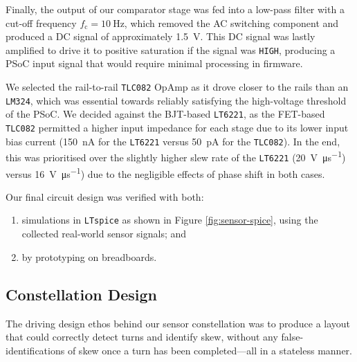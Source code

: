 \documentclass[conference]{IEEEtran}
\begin{document}
Finally, the output of our comparator stage was fed into a low-pass filter with a cut-off frequency $f_\text{c}=\qty{10}{\hertz}$, which removed the AC switching component and produced a DC signal of approximately \qty{1.5}{\volt}.
This DC signal was lastly amplified to drive it to positive saturation if the signal was \texttt{HIGH}, producing a PSoC input signal that would require minimal processing in firmware.

We selected the rail-to-rail \texttt{TLC082} OpAmp as it drove closer to the rails than an \texttt{LM324}, which was essential towards reliably satisfying the high-voltage threshold of the PSoC. We decided against the BJT-based \texttt{LT6221}, as the FET-based \texttt{TLC082} permitted a higher input impedance for each stage due to its lower input bias current (\qty{150}{\nA} for the \texttt{LT6221} versus \qty{50}{\pA} for the \texttt{TLC082}).
In the end, this was prioritised over the slightly higher slew rate of the \texttt{LT6221} (\qty{20}{\volt\per\us}) versus \qty{16}{\volt\per\us}) due to the negligible effects of phase shift in both cases.

Our final circuit design was verified with both:
\begin{enumerate}
	\item simulations in \texttt{LTspice} as shown in Figure \ref{fig:sensor-spice}, using the collected real-world sensor signals; and
	\item by prototyping on breadboards.
\end{enumerate}

\subsection{Constellation Design}

The driving design ethos behind our sensor constellation was to produce a layout that could correctly detect turns and identify skew, without any false-identifications of skew once a turn has been completed—all in a stateless manner.
\end{document}
